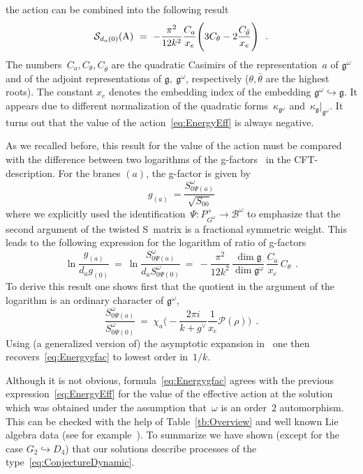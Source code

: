 \documentclass[12pt,a4paper]{article}
\newcommand{\embin}{{\hookrightarrow}}
\newcommand{\mf}{\mathfrak} %
\newcommand{\mc}{\mathcal} %
\def\Iso{\Psi}
\def\iG{G^\omega} %
\def\ig{\mf{g}^\omega} %
\def\bL{\mc{B}} %
\def\treps{\bL^\omega} %
\def\cS{{\mathcal S}}
\def\tA{{\rm A}}
\begin{document}
the action can be combined into the following result 
\begin{equation}
  \label{eq:EnergyEff}
  \cS_{d_a(0)}(\tA)\ =\ 
-\frac{\pi^2}{12k^2}\frac{C_a}{x_{e}}\Biggl(3C_\theta
-2\frac{C_{\bar{\theta}}}{x_{e}}\Biggr)\ \ .
\end{equation}
The numbers~$C_a,C_\theta,C_{\bar{\theta}}$ are the quadratic Casimirs 
of the representation~$a$ of $\ig$ and of the adjoint representations 
of $\mf{g},\:\ig$, respectively ($\theta,\bar{\theta}$ are the highest 
roots). The constant $x_{e}$ denotes the embedding index
of the embedding $\ig \hookrightarrow \mf{g}$. It appears
due to different normalization of the quadratic 
forms~$\kappa_{\ig}$ and~${\kappa_{\mf{g}}|_{\ig}}$.
It turns out that the value of the action~\eqref{eq:EnergyEff} 
is always negative.
\smallskip

As we recalled before, this result for the value of the action must 
be compared with the difference between two logarithms of the 
g-factors~\cite{Affleck:1991tk} in the CFT-description. For the 
branes $(a)$, the g-factor is given by \cite[eq.\ (4.2)]{Behrend:1999bn}
\begin{equation}
g_{(a)}\ = \frac{S_{0\Iso(a)}^\omega}{\sqrt{S_{00}}}
\end{equation}
where we explicitly used the identification~$\Iso:P_{\iG}^+\to\treps$ 
to emphasize that the second argument of the twisted S~matrix is a 
fractional symmetric weight. This leads to the following 
expression for the logarithm of ratio of g-factors  
\begin{equation}
  \label{eq:Energygfac}
  \ln\frac{g_{(a)}}{d_ag_{(0)}}
  \ = \ \ln\frac{S_{0\Iso(a)}^\omega}{d_aS_{0\Iso (0)}^\omega}
  \ =\ -\frac{\pi^2}{12k^2}\,\frac{\dim\mf{g}}{\dim\ig}\,\frac{C_a}{x_{e}}\,C_\theta\ \ .
\end{equation}
To derive this result one shows first
that the quotient in the argument of the
logarithm is an ordinary character of $\ig$,
\[
  \frac{S^{\omega}_{0\Iso(a)}}{S^{\omega}_{0\Iso (0)}}\ = \
  \chi_a\biggl(-\frac{2\pi i}{k+g^\vee}\frac{1}{x_e}\mc{P}(\rho)\biggr) \ \ .
\]
Using (a generalized
version of) the asymptotic expansion in~\cite[eq.\ (13.175)]{FrancescoCFT}
one then  recovers~\eqref{eq:Energygfac} to lowest order in~$1/k$.
\smallskip

Although it is not obvious, formula~\eqref{eq:Energygfac} agrees with 
the previous expression~\eqref{eq:EnergyEff} for the value of the 
effective action at the solution which was obtained under the 
assumption that~$\omega$ is an order~$2$ automorphism. 
This can be checked with the help of Table~\ref{tb:Overview} and well 
known Lie algebra data (see for example~\cite[p.\ 44]{Fuchs:1995}).
To summarize we have shown (except for the case $G_2\embin D_4$) that
our solutions describe processes of the type~\eqref{eq:ConjectureDynamic}.
\end{document}
